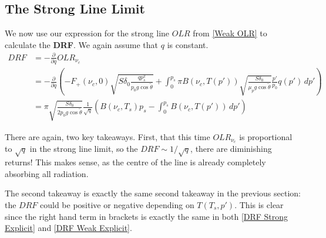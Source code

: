 \subsection{The Strong Line Limit}

We now use our expression for the strong line $OLR$ from \ref{Weak OLR} to calculate the \textbf{DRF}. We again assume that $q$ is constant.
\begin{align}
    DRF &= -\frac{\partial}{\partial q}OLR_{\nu_c}\nonumber\\
    &=-\frac{\partial}{\partial q} \left( 
        -F_+(\nu_c,0)\sqrt{S\delta_0 \frac{qp_s^2}{p_0g\cos\tilde{\theta}}}+\int_{0}^{p_s}\pi B(\nu_c,T(p'))\sqrt{\frac{S\delta_0}{\mu_pg\cos\tilde{\theta}}}\frac{p'}{p_0}q(p')\,dp'
     \right)\nonumber\\
    \label{DRF Strong Explicit}
    &= \pi\sqrt{\frac{S\delta_0}{2p_0g\cos\tilde{\theta}}}\frac{1}{\sqrt{q}}\left( 
        B(\nu_c,T_s)p_s-\int_{0}^{p_s}B(\nu_c,T(p'))\,dp'
     \right)
\end{align}

There are again, two key takeaways. First, that this time $OLR_{\nu_c}$ is proportional to $\sqrt{q}$ in the strong line limit, so the $DRF\sim 1/\sqrt{q}$, there are diminishing returns! This makes sense, as the centre of the line is already completely absorbing all radiation. 

The second takeaway is exactly the same second takeaway in the previous section: the $DRF$ could be positive or negative depending on $T(T_s,p')$. This is clear since the right hand term in brackets is exactly the same in both \ref{DRF Strong Explicit} and \ref{DRF Weak Explicit}.

